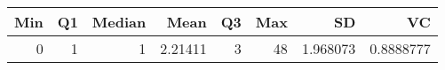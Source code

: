 
\begin{tabular}[t]{rrrrrrrr}
\toprule
Min & Q1 & Median & Mean & Q3 & Max & SD & VC\\
\midrule
0 & 1 & 1 & 2.21411 & 3 & 48 & 1.968073 & 0.8888777\\
\bottomrule
\end{tabular}